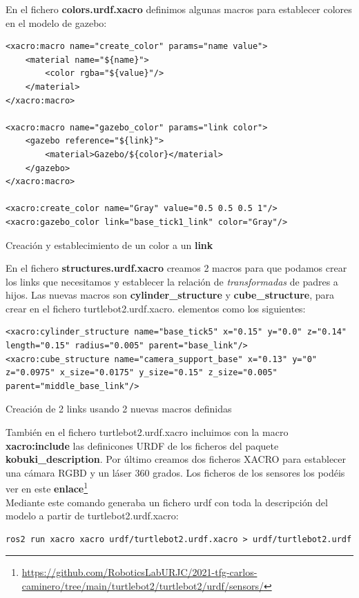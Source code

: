 En el fichero \textbf{colors.urdf.xacro} definimos algunas macros para establecer colores en el modelo de gazebo:\\
\begin{code}[H]
\begin{lstlisting}
<xacro:macro name="create_color" params="name value">
	<material name="${name}">
		<color rgba="${value}"/>
	</material>
</xacro:macro>

<xacro:macro name="gazebo_color" params="link color">
	<gazebo reference="${link}">
		<material>Gazebo/${color}</material>
	</gazebo>
</xacro:macro>

<xacro:create_color name="Gray" value="0.5 0.5 0.5 1"/>
<xacro:gazebo_color link="base_tick1_link" color="Gray"/>
\end{lstlisting}
\caption{Creación y establecimiento de un color a un \textbf{link}}
\label{fig:creacion_color_link}
\end{code}

En el fichero \textbf{structures.urdf.xacro} creamos 2 macros para que podamos crear los links que necesitamos y establecer la relación de \textit{transformadas} de padres a hijos. Las nuevas macros son \textbf{cylinder\_structure} y \textbf{cube\_structure}, para crear en el fichero turtlebot2.urdf.xacro. elementos como los siguientes:
\begin{code}[H]
\begin{lstlisting}
<xacro:cylinder_structure name="base_tick5" x="0.15" y="0.0" z="0.14" length="0.15" radius="0.005" parent="base_link"/>
<xacro:cube_structure name="camera_support_base" x="0.13" y="0" z="0.0975" x_size="0.0175" y_size="0.15" z_size="0.005" parent="middle_base_link"/>
\end{lstlisting}
\caption{Creación de 2 links usando 2 nuevas macros definidas}
\label{fig:creacion_link_macro}
\end{code}

También en el fichero turtlebot2.urdf.xacro incluimos con la macro \textbf{xacro:include} las definicones URDF de los ficheros del paquete \textbf{kobuki\_description}. Por último creamos dos ficheros XACRO para establecer una cámara RGBD y un láser 360 grados. Los ficheros de los sensores los podéis ver en este \textbf{enlace}\footnote{\url{https://github.com/RoboticsLabURJC/2021-tfg-carlos-caminero/tree/main/turtlebot2/turtlebot2/urdf/sensors/}}\\

Mediante este comando generaba un fichero urdf con toda la descripción del modelo a partir de turtlebot2.urdf.xacro:
\begin{lstlisting}
ros2 run xacro xacro urdf/turtlebot2.urdf.xacro > urdf/turtlebot2.urdf
\end{lstlisting}

